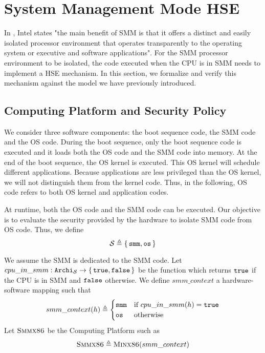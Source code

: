 \section{System Management Mode HSE} \label{sec:speccert:smm}

In \cite{intel2014manual}, Intel states "the main benefit of SMM is that it
offers a distinct and easily isolated processor environment that operates
transparently to the operating system or executive and software
applications". For the SMM processor environment to be isolated, the code
executed when the CPU is in SMM needs to implement a HSE mechanism. In this
section, we formalize and verify this mechanism against the model we have
previously introduced.

\subsection{Computing Platform and Security Policy}

We consider three software components: the boot sequence code, the SMM code and
the OS code. During the boot sequence, only the boot sequence code is executed
and it loads both the OS code and the SMM code into memory. At the end of the
boot sequence, the OS kernel is executed. This OS kernel will schedule different
applications. Because applications are less privileged than the OS kernel, we
will not distinguish them from the kernel code. Thus, in the following, OS code
refers to both OS kernel and application codes.

At runtime, both the OS code and the SMM code can be executed. Our objective is
to evaluate the security provided by the hardware to isolate SMM code from OS
code. Thus, we define \[ \mathcal{S} \triangleq \{\,\mathtt{smm}, \mathtt{os}\,\} \]

We assume the SMM is dedicated to the SMM code.  Let
$cpu\_in\_smm : \texttt{Archi}_{\mathcal{S}} \rightarrow \{\,\mathtt{true},
  \mathtt{false}\,\}$ be the function which returns $\mathtt{true}$ if the CPU is in SMM
and $\mathtt{false}$ otherwise.  We define $smm\_context$ a hardware-software
mapping such that
\[ smm\_context(h) \triangleq \begin{cases}
    \mathtt{smm} & \text{if } cpu\_in\_smm(h) = \mathtt{true} \\
    \mathtt{os} & \text{otherwise}
  \end{cases} \] Let $\textsc{Smmx86}$ be the Computing Platform such as
\[ \textsc{Smmx86} \triangleq \textsc{Minx86}(smm\_context) \]

